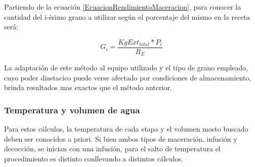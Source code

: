 \begin{itemize}
                    \par Partiendo de la ecuación \ref{EcuacionRendimientoMaceracion}, para conocer la cantidad del i-ésimo grano a utilizar según el porcentaje del mismo en la receta será:
                    
                    \begin{equation}
                        G_{i} = \frac{KgExt_{total} * P_{i}}{R_E}
                        \label{EcuacionCantidadGranoEmpirico}
                    \end{equation}
                    
                    \par La adaptación de este método al equipo utilizado y el tipo de grano empleado, cuyo poder diastacico puede verse afectado por condiciones de almacenamiento, brinda resultados mas exactos que el método anterior.
                \end{itemize}
                
            \subsubsection{Temperatura y volumen de agua}
            \par Para estos cálculos, la temperatura de cada etapa y el volumen mosto buscado deben ser conocidos a priori. Si bien ambos tipos de maceración, infusión y decocción, se inician con una infusión, para el salto de temperatura el procedimiento es distinto conllevando a distintos cálculos.
            
